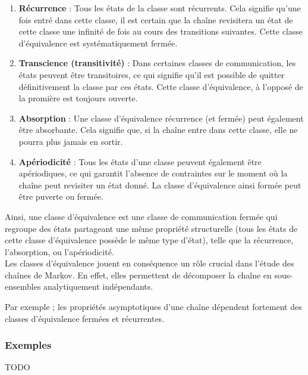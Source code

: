 \documentclass{article}
\begin{document}
\begin{enumerate}
\item \textbf{Récurrence} : Tous les états de la classe sont récurrents. Cela signifie qu'une fois entré dans cette classe, il est certain que la chaîne revisitera un état de cette classe une infinité de fois au cours des transitions suivantes. Cette classe d'équivalence est systématiquement fermée.
\item \textbf{Transcience (transitivité)} : Dans certaines classes de communication, les états peuvent être transitoires, ce qui signifie qu'il est possible de quitter définitivement la classe par ces états. Cette classe d'équivalence, à l'opposé de la promière est toujours ouverte.
\item \textbf{Absorption} : Une classe d'équivalence récurrence (et fermée) peut également être absorbante. Cela signifie que, si la chaîne entre dans cette classe, elle ne pourra plus jamais en sortir.
\item \textbf{Apériodicité} : Tous les états d'une classe peuvent également être apériodiques, ce qui garantit l'absence de contraintes sur le moment où la chaîne peut revisiter un état donné. La classe d'équivalence ainsi formée peut être puverte ou fermée. \\
\end{enumerate}

Ainsi, une classe d'équivalence est une classe de communication fermée qui regroupe des états partageant une même propriété structurelle (tous les états de cette classe d'équivalence possède le même type d'état), telle que la récurrence, l'absorption, ou l'apériodicité. \\

Les classes d'équivalence jouent en conséquence un rôle crucial dans l'étude des chaînes de Markov. En effet, elles permettent de décomposer la chaîne en sous-ensembles analytiquement indépendants.

Par exemple ; les propriétés asymptotiques d'une chaîne dépendent fortement des classes d'équivalence fermées et récurrentes. %

\subsubsection{Exemples}

TODO \\
\end{document}
